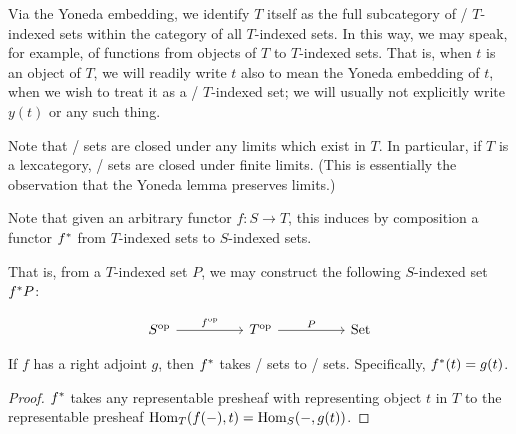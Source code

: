 \begin{convention}
Via the Yoneda embedding, we identify $T$ itself as the full subcategory of \repsmall/ $T$-indexed sets within the category of all $T$-indexed sets. In this way, we may speak, for example, of functions from objects of $T$ to $T$-indexed sets. That is, when $t$ is an object of $T$, we will readily write $t$ also to mean the Yoneda embedding of $t$, when we wish to treat it as a \repsmall/ $T$-indexed set; we will usually not explicitly write $y(t)$ or any such thing.
\end{convention}

\begin{theorem}
Note that \repsmall/ sets are closed under any limits which exist in $T$. In particular, if $T$ is a lexcategory, \repsmall/ sets are closed under finite limits. (This is essentially the observation that the Yoneda lemma preserves limits.)
\end{theorem}

\begin{definition}
Note that given an arbitrary functor $f : S \to T$, this induces by composition a functor $f^*$ from $T$-indexed sets to $S$-indexed sets.

That is, from a $T$-indexed set $P$, we may construct the following $S$-indexed set $f^* P$:

\[\begin{tikzcd}
	{\op{S}} && {\op{T}} && \Set
	\arrow["{\op{f}}", from=1-1, to=1-3]
	\arrow["P", from=1-3, to=1-5]
\end{tikzcd}\]
\end{definition}

\begin{theorem}\label{RepsmallRightAdjoint}
If $f$ has a right adjoint $g$, then $f^*$ takes \repsmall/ sets to \repsmall/ sets. Specifically, $f^*(t) = g(t)$.
\end{theorem}
\begin{proof}
$f^*$ takes any representable presheaf with representing object $t$ in $T$ to the representable presheaf $\operatorname{Hom}_T(f(-), t) = \operatorname{Hom}_S(-, g(t))$.
\end{proof}

